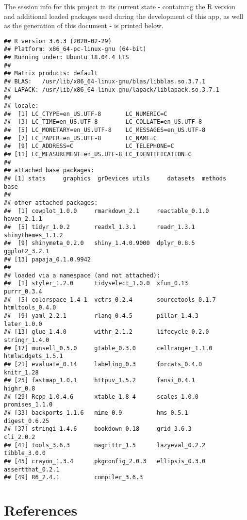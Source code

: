 \documentclass[english,man,floatsintext]{apa6}
\begin{document}
The session info for this project in its current state - containing the R version and additional loaded packages used during the development of this app, as well as the generation of this document - is printed below.

\begin{verbatim}
## R version 3.6.3 (2020-02-29)
## Platform: x86_64-pc-linux-gnu (64-bit)
## Running under: Ubuntu 18.04.4 LTS
## 
## Matrix products: default
## BLAS:   /usr/lib/x86_64-linux-gnu/blas/libblas.so.3.7.1
## LAPACK: /usr/lib/x86_64-linux-gnu/lapack/liblapack.so.3.7.1
## 
## locale:
##  [1] LC_CTYPE=en_US.UTF-8       LC_NUMERIC=C              
##  [3] LC_TIME=en_US.UTF-8        LC_COLLATE=en_US.UTF-8    
##  [5] LC_MONETARY=en_US.UTF-8    LC_MESSAGES=en_US.UTF-8   
##  [7] LC_PAPER=en_US.UTF-8       LC_NAME=C                 
##  [9] LC_ADDRESS=C               LC_TELEPHONE=C            
## [11] LC_MEASUREMENT=en_US.UTF-8 LC_IDENTIFICATION=C       
## 
## attached base packages:
## [1] stats     graphics  grDevices utils     datasets  methods   base     
## 
## other attached packages:
##  [1] cowplot_1.0.0     rmarkdown_2.1     reactable_0.1.0   haven_2.1.1      
##  [5] tidyr_1.0.2       readxl_1.3.1      readr_1.3.1       shinythemes_1.1.2
##  [9] shinymeta_0.2.0   shiny_1.4.0.9000  dplyr_0.8.5       ggplot2_3.2.1    
## [13] papaja_0.1.0.9942
## 
## loaded via a namespace (and not attached):
##  [1] styler_1.2.0      tidyselect_1.0.0  xfun_0.13         purrr_0.3.4      
##  [5] colorspace_1.4-1  vctrs_0.2.4       sourcetools_0.1.7 htmltools_0.4.0  
##  [9] yaml_2.2.1        rlang_0.4.5       pillar_1.4.3      later_1.0.0      
## [13] glue_1.4.0        withr_2.1.2       lifecycle_0.2.0   stringr_1.4.0    
## [17] munsell_0.5.0     gtable_0.3.0      cellranger_1.1.0  htmlwidgets_1.5.1
## [21] evaluate_0.14     labeling_0.3      forcats_0.4.0     knitr_1.28       
## [25] fastmap_1.0.1     httpuv_1.5.2      fansi_0.4.1       highr_0.8        
## [29] Rcpp_1.0.4.6      xtable_1.8-4      scales_1.0.0      promises_1.1.0   
## [33] backports_1.1.6   mime_0.9          hms_0.5.1         digest_0.6.25    
## [37] stringi_1.4.6     bookdown_0.18     grid_3.6.3        cli_2.0.2        
## [41] tools_3.6.3       magrittr_1.5      lazyeval_0.2.2    tibble_3.0.0     
## [45] crayon_1.3.4      pkgconfig_2.0.3   ellipsis_0.3.0    assertthat_0.2.1 
## [49] R6_2.4.1          compiler_3.6.3
\end{verbatim}

\newpage

\hypertarget{references}{%
\section{References}\label{references}}
\end{document}
